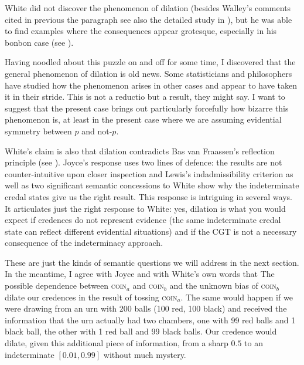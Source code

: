 \documentclass[11pt]{article}
\begin{document}
White did not discover the phenomenon of dilation (besides Walley's
comments cited in previous the paragraph see also the detailed study
in ), but he was able to find
examples where the consequences appear grotesque, especially in his
bonbon case (see ).

\begin{quotex}
  Having noodled about this puzzle on and off for some time, I
  discovered that the general phenomenon of dilation is old news. Some
  statisticians and philosophers have studied how the phenomenon
  arises in other cases and appear to have taken it in their stride.
  This is not a reductio but a result, they might say. I want to
  suggest that the present case brings out particularly forcefully how
  bizarre this phenomenon is, at least in the present case where we
  are assuming evidential symmetry between $p$ and not-$p$.
\end{quotex}

White's claim is also that dilation contradicts Bas van Fraassen's
reflection principle (see ). Joyce's
response uses two lines of defence: the results are not
counter-intuitive upon closer inspection and Lewis's indadmissibility
criterion as well as two significant semantic concessions to White
show why the indeterminate credal states give us the right result.
This response is intriguing in several ways. It articulates just the
right response to White: yes, dilation is what you would expect if
credences do not represent evidence (the same indeterminate credal
state can reflect different evidential situations) and if the CGT is
not a necessary consequence of the indeterminacy approach.

These are just the kinds of semantic questions we will address in the
next section. In the meantime, I agree with Joyce and with White's own
words that  The possible
dependence between \textsc{coin}$_{a}$ and \textsc{coin}$_{b}$ and the
unknown bias of \textsc{coin}$_{b}$ dilate our credences in the result
of tossing \textsc{coin}$_{a}$. The same would happen if we were
drawing from an urn with 200 balls (100 red, 100 black) and received
the information that the urn actually had two chambers, one with 99
red balls and 1 black ball, the other with 1 red ball and 99 black
balls. Our credence would dilate, given this additional piece of
information, from a sharp $0.5$ to an indeterminate $[0.01,0.99]$
without much mystery.
\end{document}
